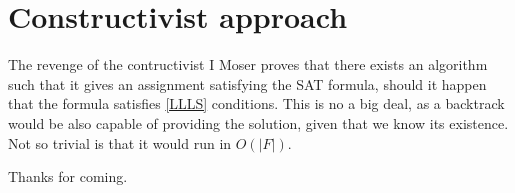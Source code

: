 \documentclass{beamer}
\begin{document}
\section{Constructivist approach}
\begin{frame}{The revenge of the contructivist I}
Moser proves that there exists an algorithm such that it gives an assignment satisfying the SAT formula, should it happen that the formula satisfies \ref{LLLS} conditions. This is no a big deal, as a backtrack would be also capable of providing the solution, given that we know its existence. Not so trivial is that it would run in $O(|F|)$. 
\end{frame}















\begin{frame}[standout]
  Thanks for coming.
\end{frame}
\end{document}
